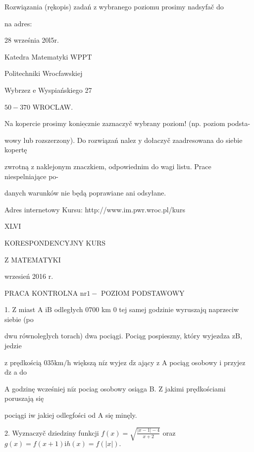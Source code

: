 \documentclass[a4paper,12pt]{article}
\begin{document}
Rozwiązania (rękopis) zadań z wybranego poziomu prosimy nadsyfač do

na adres:

28 września 20l5r.

Katedra Matematyki WPPT

Politechniki Wrocfawskiej

Wybrzez $\mathrm{e}$ Wyspiańskiego 27

$50-370$ WROCLAW.

Na kopercie prosimy $\underline{\mathrm{k}\mathrm{o}\mathrm{n}\mathrm{i}\mathrm{e}\mathrm{c}\mathrm{z}\mathrm{n}\mathrm{i}\mathrm{e}}$ zaznaczyč wybrany poziom! (np. poziom podsta-

wowy lub rozszerzony). Do rozwiązań nalez $\mathrm{y}$ dołaczyč zaadresowana do siebie kopertę

zwrotną $\mathrm{z}$ naklejonym znaczkiem, odpowiednim do wagi listu. Prace niespelniające po-

danych warunków nie będą poprawiane ani odsyłane.

Adres internetowy Kursu: http://www.im.pwr.wroc.pl/kurs







XLVI

KORESPONDENCYJNY KURS

Z MATEMATYKI

wrzesień 2016 r.

PRACA KONTROLNA $\mathrm{n}\mathrm{r} 1-$ POZIOM PODSTAWOWY

1. $\mathrm{Z}$ miast A $\mathrm{i}\mathrm{B}$ odległych $0700$ km $0$ tej samej godzinie wyruszajq naprzeciw siebie (po

dwu równoleglych torach) dwa pociągi. Pociąg pospieszny, który wyjezdza $\mathrm{z}\mathrm{B}$, jedzie

$\mathrm{z}$ prędkością $035\mathrm{k}\mathrm{m}/\mathrm{h}$ większą $\mathrm{n}\mathrm{i}\dot{\mathrm{z}}$ wyjez $\mathrm{d}\dot{\mathrm{z}}$ ający $\mathrm{z}$ A pociąg osobowy $\mathrm{i}$ przyjez $\mathrm{d}\dot{\mathrm{z}}$ a do

A godzinę wcześniej $\mathrm{n}\mathrm{i}\dot{\mathrm{z}}$ pociag osobowy osiąga B. $\mathrm{Z}$ jakimi prędkościami poruszają się

pociągi $\mathrm{i}\mathrm{w}$ jakiej odlegfości od A się minęly.

2. Wyznaczyč dziedziny funkcji $f(x)=\sqrt{\frac{|x-1|-4}{x+2}}$ oraz $g(x)=f(x+1) \mathrm{i}h(x)=f(|x|).$
\end{document}
